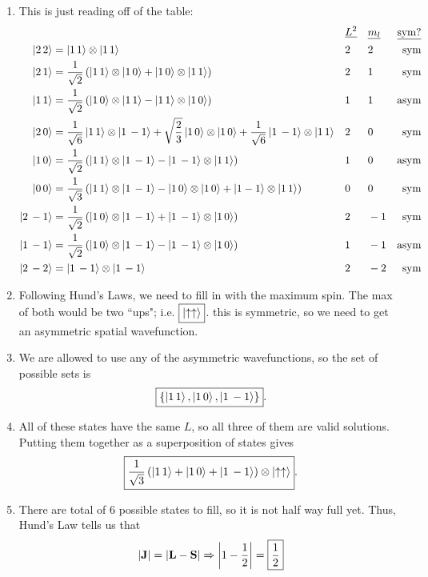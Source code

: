\documentclass[11pt]{article}
\begin{document}
\begin{enumerate}[label=\alph*)]
\item 
This is just reading off of the table:
\begin{align*}
& & &\underline{L^2}  & & \underline{m_l} &  \underline{\text{sym?}}\\
\ket{2 \, 2} &=  \ket{1 \, 1} \otimes \ket{1 \, 1} && 2 && 2 & \text{sym}\\
\ket{2 \, 1} & = \frac{1}{\sqrt{2}}\left(\ket{1 \, 1}\otimes \ket{1 \, 0} + \ket{1 \, 0} \otimes \ket{1 \, 1}\right) && 2 && 1 & \text{sym}\\
\ket{1 \, 1} & = \frac{1}{\sqrt{2}}\left(\ket{1 \, 0}\otimes \ket{1 \, 1} - \ket{1 \, 1} \otimes \ket{1 \, 0}\right) && 1 && 1 & \text{asym}\\
\ket{2 \, 0} & = \frac{1}{\sqrt{6}}\ket{1 \, 1} \otimes \ket{1 \, -1} + \sqrt{\frac{2}{3}}\ket{1 \, 0}\otimes \ket{1 \, 0} + \frac{1}{\sqrt{6}}\ket{1 \, -1}\otimes \ket{1 \, 1} && 2 && 0 & \text{sym}\\
\ket{1 \, 0} &= \frac{1}{\sqrt{2}}\left(\ket{1 \, 1}\otimes \ket{1 \, -1} - \ket{1 \, -1}\otimes \ket{1 \, 1}\right) && 1 && 0 & \text{asym}\\
\ket{0 \, 0} & = \frac{1}{\sqrt{3}}\left(\ket{1 \, 1}\otimes\ket{1 \, -1} - \ket{1 \, 0}\otimes \ket{1 \, 0} + \ket{1 -1}\otimes \ket{1 \, 1}\right) && 0 && 0 & \text{sym}\\
\ket{2 \, -1} & = \frac{1}{\sqrt{2}}\left(\ket{1 \, 0}\otimes \ket{1 \, -1} + \ket{1 \, -1}\otimes\ket{1 \, 0}\right) && 2 && -1 & \text{sym}\\
\ket{1 \, -1} &= \frac{1}{\sqrt{2}}\left(\ket{1 \, 0}\otimes \ket{1 \, -1} - \ket{1 \, -1}\otimes \ket{1 \, 0}\right) && 1 && -1 & \text{asym}\\
\ket{2 \, -2} &= \ket{1 \, -1} \otimes \ket{1 \, -1} && 2 && -2 & \text{sym}
\end{align*}

\item Following Hund's Laws, we need to fill in with the maximum spin. The max of both would be two ``ups"; i.e. $\boxed{\ket{\uparrow\uparrow}}$. this is symmetric, so we need to get an asymmetric spatial wavefunction. 

\item We are allowed to use any of the asymmetric wavefunctions, so the set of possible sets is
\[\boxed{\left\{\ket{1 \, 1}, \ket{1 \, 0}, \ket{1 \, -1}\right\}}.\]

\item All of these states have the same $L$, so all three of them are valid solutions. Putting them together as a superposition of states gives
\[\boxed{\frac{1}{\sqrt{3}}\left(\ket{1 \, 1} + \ket{1 \, 0} + \ket{1 \, -1}\right)\otimes \ket{\uparrow\uparrow}}.\]

\item There are total of 6 possible states to fill, so it is not half way full yet. Thus, Hund's Law tells us that 
\[\abs{\vb{J}} = \abs{\vb{L} - \vb{S}} \Rightarrow \abs{1 - \frac{1}{2}} = \boxed{\frac{1}{2}}\]
\end{enumerate}

\newpage
\end{document}

